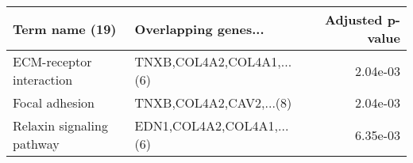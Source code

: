 \begin{tabular}{llr}
\toprule
           Term name (19) &      Overlapping genes... &  Adjusted p-value \\
\midrule
 ECM-receptor interaction & TNXB,COL4A2,COL4A1,...(6) &          2.04e-03 \\
           Focal adhesion &   TNXB,COL4A2,CAV2,...(8) &          2.04e-03 \\
Relaxin signaling pathway & EDN1,COL4A2,COL4A1,...(6) &          6.35e-03 \\
\bottomrule
\end{tabular}

